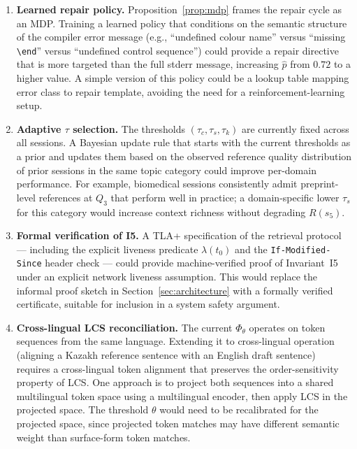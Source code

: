 \begin{enumerate}[label=\textbf{F\arabic*.},leftmargin=2.4em]
  \item \textbf{Learned repair policy.}
    Proposition~\ref{prop:mdp} frames the repair cycle as an MDP.
    Training a learned policy that conditions on the semantic structure of the
    compiler error message (e.g., ``undefined colour name'' versus ``missing
    \texttt{\textbackslash end}'' versus ``undefined control sequence'') could
    provide a repair directive that is more targeted than the full stderr message,
    increasing $\hat{p}$ from $0.72$ to a higher value.
    A simple version of this policy could be a lookup table mapping error class
    to repair template, avoiding the need for a reinforcement-learning setup.

  \item \textbf{Adaptive $\tau$ selection.}
    The \cgrag{} thresholds $(\tau_c,\tau_s,\tau_k)$ are currently fixed across
    all sessions.
    A Bayesian update rule that starts with the current thresholds as a prior
    and updates them based on the observed reference quality distribution of prior
    sessions in the same topic category could improve per-domain performance.
    For example, biomedical sessions consistently admit preprint-level references
    at $Q_3$ that perform well in practice; a domain-specific lower $\tau_s$
    for this category would increase context richness without degrading $R(s_5)$.

  \item \textbf{Formal verification of I5.}
    A TLA+ specification of the retrieval protocol — including the explicit liveness
    predicate $\lambda(t_0)$ and the \texttt{If-Modified-Since} header check —
    could provide machine-verified proof of Invariant~I5 under an explicit network
    liveness assumption.
    This would replace the informal proof sketch in Section~\ref{sec:architecture}
    with a formally verified certificate, suitable for inclusion in a system safety
    argument.

  \item \textbf{Cross-lingual LCS reconciliation.}
    The current $\Phi_\theta$ operates on token sequences from the same language.
    Extending it to cross-lingual operation (aligning a Kazakh reference sentence
    with an English draft sentence) requires a cross-lingual token alignment that
    preserves the order-sensitivity property of LCS.
    One approach is to project both sequences into a shared multilingual token
    space using a multilingual encoder, then apply LCS in the projected space.
    The threshold $\theta$ would need to be recalibrated for the projected space,
    since projected token matches may have different semantic weight than surface-form
    token matches.
\end{enumerate}
